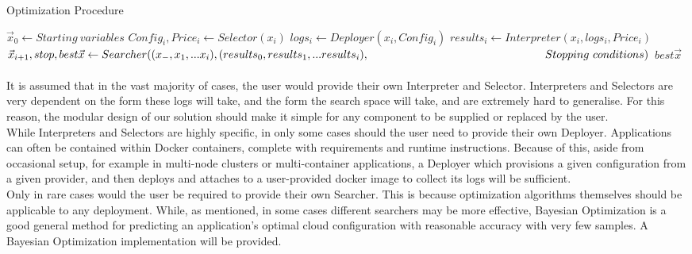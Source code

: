 \documentclass{report}
\begin{document}
\begin{algorithm}
\caption{Optimization Procedure}
\label{alg:Optimization}
\begin{algorithmic}
\State $\vec{x}_{0}\gets Starting \ variables$
\State $Config_i, Price_i\gets Selector(x_i)$
\State $logs_i \gets Deployer(x_i, Config_i)$
\State $results_i \gets Interpreter(x_i, logs_i, Price_i)$
\State $\vec{x}_{i+1}, stop, best\vec{x} \gets Searcher((x_-, x_1,...x_i), (results_0, results_1,...results_i),\newline
\hspace*{5.6cm}Stopping\ conditions)$
\State \Return $best\vec{x}$
\EndIf
\EndFor
\EndProcedure
\end{algorithmic}
\end{algorithm}
 

\paragraph{}
It is assumed that in the vast majority of cases, the user would provide their own Interpreter and Selector. Interpreters and Selectors are very dependent on the form these logs will take, and the form the search space will take, and are extremely hard to generalise. For this reason, the modular design of our solution should make it simple for any component to be supplied or replaced by the user.  \\
While Interpreters and Selectors are highly specific, in only some cases should the user need to provide their own Deployer. Applications can often be contained within Docker containers, complete with requirements and runtime instructions. Because of this, aside from occasional setup, for example in multi-node clusters or multi-container applications, a Deployer which provisions a given configuration from a given provider, and then deploys and attaches to a user-provided docker image to collect its logs will be sufficient.  \\
Only in rare cases would the user be required to provide their own Searcher. This is because optimization algorithms themselves should be applicable to any deployment. While, as mentioned, in some cases different searchers may be more effective, Bayesian Optimization is a good general method for predicting an application's optimal cloud configuration with reasonable accuracy with very few samples. A Bayesian Optimization implementation will be provided.
\end{document}

